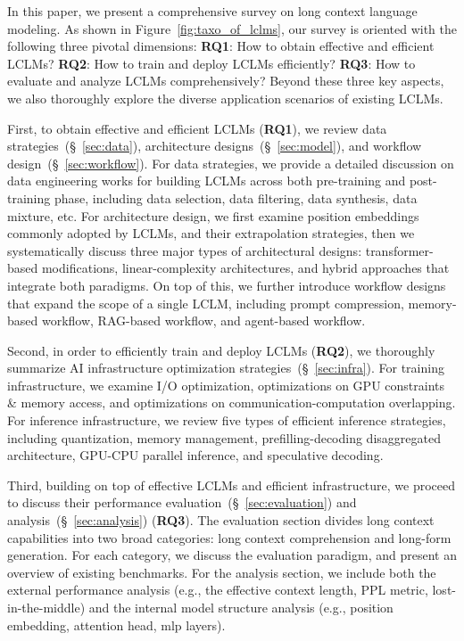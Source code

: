 \documentclass[11pt, a4paper, logo, copyright, nonumbering]{map}
\begin{document}
In this paper, 
we present a comprehensive survey on long context language modeling. As shown in Figure~\ref{fig:taxo_of_lclms}, our survey is oriented with the following three pivotal dimensions: \textbf{RQ1}: How to obtain effective and efficient LCLMs? \textbf{RQ2}: How to train and deploy LCLMs efficiently? \textbf{RQ3}: How to evaluate and analyze LCLMs comprehensively? Beyond these three key
aspects, we also thoroughly explore the diverse application scenarios of existing  LCLMs.






First, to obtain effective and efficient LCLMs (\textbf{RQ1}), we review data strategies~(\S~\ref{sec:data}), architecture designs~(\S~\ref{sec:model}), and workflow design~(\S~\ref{sec:workflow}). For data strategies, we provide a detailed discussion on data engineering works for building LCLMs across both pre-training and post-training phase, including data selection, data filtering, data synthesis, data mixture, etc. For architecture design, we first examine position embeddings commonly adopted by LCLMs, and their extrapolation strategies, then we systematically discuss three major
types of architectural designs: transformer-based modifications, linear-complexity architectures, and hybrid approaches that integrate both paradigms. On top of this, we further introduce workflow designs that expand the scope of a single LCLM, including prompt compression, memory-based workflow, RAG-based workflow, and agent-based workflow. 

Second, in order to efficiently train and deploy LCLMs (\textbf{RQ2}), we thoroughly summarize AI infrastructure optimization strategies~(\S~\ref{sec:infra}). For training infrastructure, we examine I/O optimization, optimizations on GPU constraints \& memory access, and optimizations on communication-computation overlapping. For inference infrastructure, we review five types of efficient inference strategies, including quantization, memory management, prefilling-decoding disaggregated architecture, GPU-CPU parallel inference, and speculative decoding.

Third, building on top of effective LCLMs and efficient infrastructure, we proceed to discuss their performance evaluation~(\S~\ref{sec:evaluation}) and analysis~(\S~\ref{sec:analysis}) (\textbf{RQ3}). The evaluation section divides long context capabilities into two broad categories: long context comprehension and long-form generation. For each category, we discuss the evaluation paradigm, and present an overview of existing benchmarks. For the analysis section, we include both the external performance analysis (e.g.,  the effective context length, PPL metric, lost-in-the-middle) and the internal model structure analysis (e.g., position embedding, attention head, mlp layers).
\end{document}

